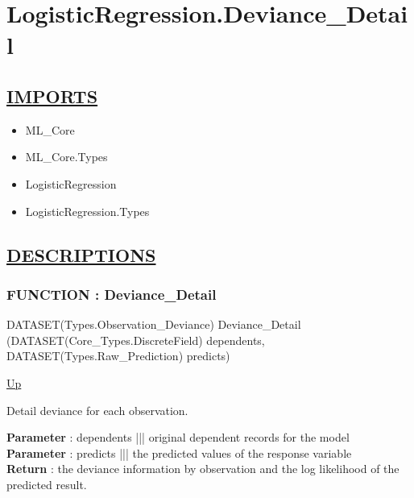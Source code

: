\chapter*{LogisticRegression.Deviance\_Detail}
\hypertarget{ecldoc:toc:LogisticRegression.Deviance_Detail}{}

\section*{\underline{IMPORTS}}
\begin{itemize}
\item ML\_Core
\item ML\_Core.Types
\item LogisticRegression
\item LogisticRegression.Types
\end{itemize}

\section*{\underline{DESCRIPTIONS}}
\subsection*{FUNCTION : Deviance\_Detail}
\hypertarget{ecldoc:logisticregression.deviance_detail}{}
\begin{minipage}[t]{\textwidth}
\begin{flushleft}
DATASET(Types.Observation\_Deviance) Deviance\_Detail (DATASET(Core\_Types.DiscreteField) dependents, DATASET(Types.Raw\_Prediction) predicts)
\end{flushleft}
\end{minipage}
\hyperlink{ecldoc:toc:LogisticRegression}{Up}

\par
Detail deviance for each observation.
\par
\textbf{Parameter} : dependents ||| original dependent records for the model \\
\textbf{Parameter} : predicts ||| the predicted values of the response variable \\
\textbf{Return} : the deviance information by observation and the log likelihood of the predicted result. \\
